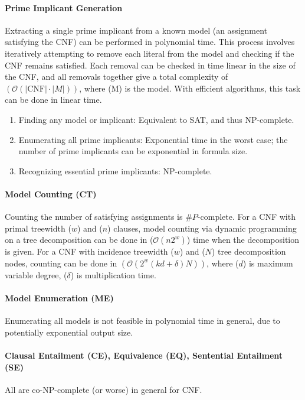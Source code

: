 \paragraph{Prime Implicant Generation}
Extracting a single prime implicant from a known model (an assignment satisfying the CNF) can be performed in polynomial time. This process involves iteratively attempting to remove each literal from the model and checking if the CNF remains satisfied. Each removal can be checked in time linear in the size of the CNF, and all removals together give a total complexity of $(\mathcal{O}(|\text{CNF}| \cdot |M|))$, where (M) is the model. With efficient algorithms, this task can be done in linear time.
\begin{enumerate}
    \item Finding any model or implicant: Equivalent to SAT, and thus NP-complete.
    \item Enumerating all prime implicants: Exponential time in the worst case; the number of prime implicants can be exponential in formula size.
    \item Recognizing essential prime implicants: NP-complete.
\end{enumerate}

\paragraph{Model Counting (CT)}
Counting the number of satisfying assignments is $\#P$-complete.
For a CNF with primal treewidth ($w$) and ($n$) clauses, model counting via dynamic programming on a tree decomposition can be done in ($\mathcal{O}(n2^w)$) time when the decomposition is given.
For a CNF with incidence treewidth ($w$) and ($N$) tree decomposition nodes, counting can be done in $(\mathcal{O}(2^w(kd+\delta)N))$, where ($d$) is maximum variable degree, ($\delta$) is multiplication time.

\paragraph{Model Enumeration (ME)}
Enumerating all models is not feasible in polynomial time in general, due to potentially exponential output size.

\paragraph{Clausal Entailment (CE), Equivalence (EQ), Sentential Entailment (SE)}
All are co-NP-complete (or worse) in general for CNF.


